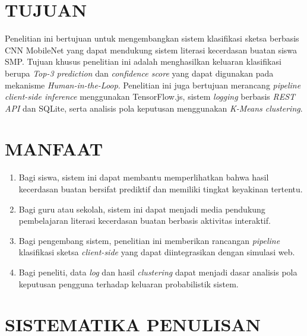 \documentclass[10pt,twoside,openright]{report}
\begin{document}
\section{TUJUAN}
\label{sec:tujuan}

Penelitian ini bertujuan untuk mengembangkan sistem klasifikasi sketsa berbasis CNN MobileNet yang dapat mendukung sistem literasi kecerdasan buatan siswa SMP. Tujuan khusus penelitian ini adalah menghasilkan keluaran klasifikasi berupa \textit{Top-3 prediction} dan \textit{confidence score} yang dapat digunakan pada mekanisme \textit{Human-in-the-Loop}. Penelitian ini juga bertujuan merancang \textit{pipeline client-side inference} menggunakan TensorFlow.js, sistem \textit{logging} berbasis \textit{REST API} dan SQLite, serta analisis pola keputusan menggunakan \textit{K-Means clustering}.

\section{MANFAAT}
\label{sec:manfaat}

\begin{enumerate}
    \item Bagi siswa, sistem ini dapat membantu memperlihatkan bahwa hasil kecerdasan buatan bersifat prediktif dan memiliki tingkat keyakinan tertentu.
    \item Bagi guru atau sekolah, sistem ini dapat menjadi media pendukung pembelajaran literasi kecerdasan buatan berbasis aktivitas interaktif.
    \item Bagi pengembang sistem, penelitian ini memberikan rancangan \textit{pipeline} klasifikasi sketsa \textit{client-side} yang dapat diintegrasikan dengan simulasi web.
    \item Bagi peneliti, data \textit{log} dan hasil \textit{clustering} dapat menjadi dasar analisis pola keputusan pengguna terhadap keluaran probabilistik sistem.
\end{enumerate}

\section{SISTEMATIKA PENULISAN}
\label{sec:sistematika-penulisan}
\end{document}
